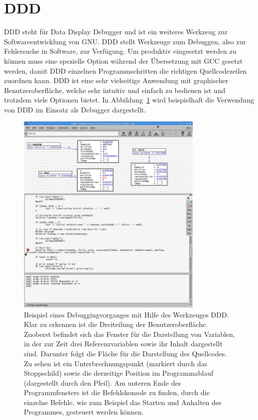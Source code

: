 \section{DDD}
DDD steht für Data Display Debugger und ist ein weiteres Werkzeug zur Softwareentwicklung von GNU\@. DDD stellt Werkzeuge zum Debuggen, also zur Fehlersuche in Software, zur Verfügung. Um produktiv eingesetzt
werden zu können muss eine spezielle Option während der Übersetzung mit GCC gesetzt werden, damit DDD einzelnen Programmschritten die richtigen Quellcodezeilen zuordnen kann. DDD ist eine sehr vielseitige
Anwendung mit graphischer Benutzeroberfläche, welche sehr intuitiv und einfach zu bedienen ist und trotzdem viele Optionen bietet. In Abbildung~\ref{img:ddd} wird beispielhaft die Verwendung von DDD im
Einsatz als Debugger dargestellt.

\begin{figure}
\centering
\includegraphics[width=0.8\textwidth]{img/ddd.png}
\caption[Beispielhafte Verwendung von DDD]{Beispiel eines Debuggingvorganges mit Hilfe des Werkzeuges DDD. Klar zu erkennen ist die Dreiteilung der Benutzeroberfläche.
Zuoberst befindet sich das Fenster für die Darstellung von Variablen, in der zur Zeit drei Referenzvariablen sowie ihr Inhalt dargestellt sind. Darunter folgt die Fläche für die Darstellung des Quellcodes.
Zu sehen ist ein Unterbrechnungspunkt (markiert durch das Stoppschild) sowie die derzeitige Position im Programmablauf (dargestellt durch den Pfeil). Am unteren Ende des Programmfensters ist die Befehlskonsole
zu finden, durch die einzelne Befehle, wie zum Beispiel das Starten und Anhalten des Programmes, gesteuert werden können.}
\label{img:ddd}
\end{figure}

